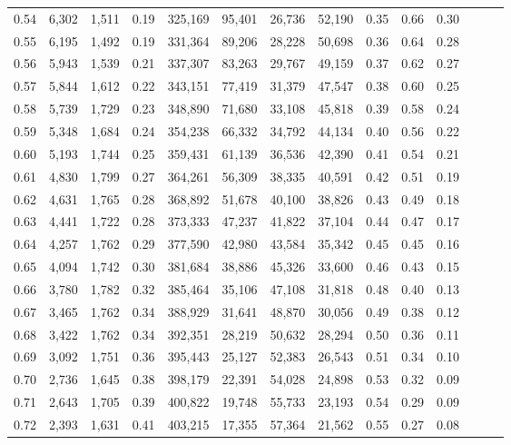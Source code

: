 \begin{tabular}{rrrrrrrrrrrrrr}
0.54 &  6,302 &  1,511 &  0.19 &  325,169 &   95,401 &  26,736 &  52,190 &  0.35 &  0.66 &      0.30 \\
0.55 &  6,195 &  1,492 &  0.19 &  331,364 &   89,206 &  28,228 &  50,698 &  0.36 &  0.64 &      0.28 \\
0.56 &  5,943 &  1,539 &  0.21 &  337,307 &   83,263 &  29,767 &  49,159 &  0.37 &  0.62 &      0.27 \\
0.57 &  5,844 &  1,612 &  0.22 &  343,151 &   77,419 &  31,379 &  47,547 &  0.38 &  0.60 &      0.25 \\
0.58 &  5,739 &  1,729 &  0.23 &  348,890 &   71,680 &  33,108 &  45,818 &  0.39 &  0.58 &      0.24 \\
0.59 &  5,348 &  1,684 &  0.24 &  354,238 &   66,332 &  34,792 &  44,134 &  0.40 &  0.56 &      0.22 \\
0.60 &  5,193 &  1,744 &  0.25 &  359,431 &   61,139 &  36,536 &  42,390 &  0.41 &  0.54 &      0.21 \\
0.61 &  4,830 &  1,799 &  0.27 &  364,261 &   56,309 &  38,335 &  40,591 &  0.42 &  0.51 &      0.19 \\
0.62 &  4,631 &  1,765 &  0.28 &  368,892 &   51,678 &  40,100 &  38,826 &  0.43 &  0.49 &      0.18 \\
0.63 &  4,441 &  1,722 &  0.28 &  373,333 &   47,237 &  41,822 &  37,104 &  0.44 &  0.47 &      0.17 \\
0.64 &  4,257 &  1,762 &  0.29 &  377,590 &   42,980 &  43,584 &  35,342 &  0.45 &  0.45 &      0.16 \\
0.65 &  4,094 &  1,742 &  0.30 &  381,684 &   38,886 &  45,326 &  33,600 &  0.46 &  0.43 &      0.15 \\
0.66 &  3,780 &  1,782 &  0.32 &  385,464 &   35,106 &  47,108 &  31,818 &  0.48 &  0.40 &      0.13 \\
0.67 &  3,465 &  1,762 &  0.34 &  388,929 &   31,641 &  48,870 &  30,056 &  0.49 &  0.38 &      0.12 \\
0.68 &  3,422 &  1,762 &  0.34 &  392,351 &   28,219 &  50,632 &  28,294 &  0.50 &  0.36 &      0.11 \\
0.69 &  3,092 &  1,751 &  0.36 &  395,443 &   25,127 &  52,383 &  26,543 &  0.51 &  0.34 &      0.10 \\
0.70 &  2,736 &  1,645 &  0.38 &  398,179 &   22,391 &  54,028 &  24,898 &  0.53 &  0.32 &      0.09 \\
0.71 &  2,643 &  1,705 &  0.39 &  400,822 &   19,748 &  55,733 &  23,193 &  0.54 &  0.29 &      0.09 \\
0.72 &  2,393 &  1,631 &  0.41 &  403,215 &   17,355 &  57,364 &  21,562 &  0.55 &  0.27 &      0.08 \\

\end{tabular}
